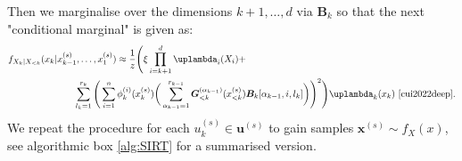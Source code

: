 Then we marginalise over the dimensions $k+1 , \dots, d$ via $\bm{B}_k$ so that the next "conditional marginal" is given as:
\begin{align}\begin{split} 
	 f_{X_k|X_{<k}}(x_k|x^{(s)}_{k-1},\dots,x^{(s)}_1) \approx \frac{1}{z}
\Bigg( 
\xi \prod_{i=k+1}^{d} \uplambda_i(X_i) +&  \\
\sum_{l_{k} = 1}^{r_{k}} \Bigg( \sum_{i = 1}^{n}  \phi^{(i)}_k(x^{(s)}_k) \bigg( \sum_{\alpha_{k-1} = 1}^{r_{k-1}} \bm{G}^{(\alpha_{k-1})}_{<k}(x^{(s)}_{<k}) &\bm{B}_k[\alpha_{k-1},i,l_k] \bigg) \Bigg)^2 \Bigg) \uplambda_k(x_k) \, \,  \text{\cite[Eq. 31]{cui2022deep}}.
	\end{split} 
	\label{eq:CurrMarg} 
\end{align}
We repeat the procedure for each $u^{(s)}_k \in \bm{u}^{(s)}$ to gain samples $\bm{x}^{(s)} \sim f_{X}(x)$, see algorithmic box \ref{alg:SIRT} for a summarised version.






